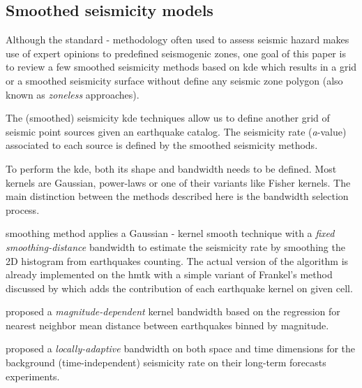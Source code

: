 \documentclass[draft, grl]{agutex}
\begin{document}
\begin{article}


\subsection{Smoothed seismicity models}

Although the standard \citet{cornell_1968}-\citet{mcguire_1976} methodology often used to assess seismic hazard makes use of expert opinions to predefined seismogenic zones, one goal of this paper is to review a few smoothed seismicity methods \citep{riznichenko_1959} based on \gls{kde} which results in a grid or a smoothed seismicity surface without define any seismic zone polygon (also known as \textit{zoneless} approaches).

The (smoothed) seismicity \gls{kde} techniques allow us to define another grid of seismic point sources given an earthquake catalog. The seismicity rate (\emph{a}-value) associated to each source is defined by the smoothed seismicity methods.

To perform the \gls{kde}, both its shape and bandwidth needs to be defined. Most kernels are Gaussian, power-laws or one of their variants like Fisher kernels. The main distinction between the methods described here is the bandwidth selection process.

\citet{frankel_1995} smoothing method applies a Gaussian \citet{nadaraya_1964}-\citet{watson_1964} kernel smooth technique with a \emph{fixed smoothing-distance} bandwidth to estimate the seismicity rate by smoothing the 2D histogram from earthquakes counting. The actual version of the algorithm is already implemented on the \gls{hmtk} \citep{weatherill_2012, weatherill_2014_1} with a simple variant of Frankel's method discussed by \citet{zechar_jordan_2010} which adds the contribution of each earthquake kernel on given cell. 

\citet{woo_1996} proposed a \emph{magnitude-dependent} kernel bandwidth based on the regression for nearest neighbor mean distance between earthquakes binned by magnitude.

\citet{helmstetter_2012} proposed a \emph{locally-adaptive} bandwidth on both space and time dimensions for the background (time-independent) seismicity rate on their long-term forecasts experiments.


\end{article}
\end{document}
